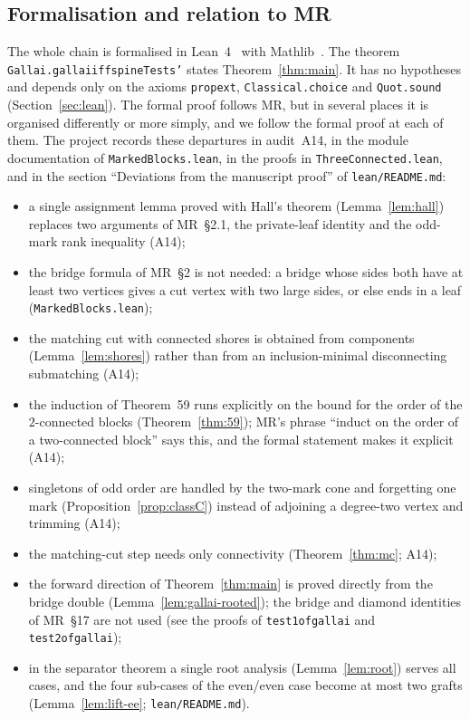 \documentclass[11pt]{amsart}
\theoremstyle{definition}
\theoremstyle{remark}
\renewcommand{\_}{\oldunderscore\allowbreak}
\begin{document}
\subsection*{Formalisation and relation to MR}
The whole chain is formalised in Lean~4~\cite{Lean4} with Mathlib~\cite{Mathlib}. The theorem
\texttt{Gallai.gallai\_iff\_spineTests'} states Theorem~\ref{thm:main}. It has no hypotheses and
depends only on the axioms \texttt{propext}, \texttt{Classical.choice} and \texttt{Quot.sound}
(Section~\ref{sec:lean}). The formal proof follows MR, but in several places it is organised
differently or more simply, and we follow the formal proof at each of them. The project records
these departures in audit~A14, in the module documentation of \texttt{MarkedBlocks.lean}, in the
proofs in \texttt{ThreeConnected.lean}, and in the section ``Deviations from the manuscript proof'' of
\texttt{lean/README.md}:
\begin{itemize}
\item a single assignment lemma proved with Hall's theorem (Lemma~\ref{lem:hall}) replaces two
arguments of MR~\S2.1, the private-leaf identity and the odd-mark rank inequality (A14);
\item the bridge formula of MR~\S2 is not needed: a bridge whose sides both have at least two
vertices gives a cut vertex with two large sides, or else ends in a leaf (\texttt{MarkedBlocks.lean});
\item the matching cut with connected shores is obtained from components
(Lemma~\ref{lem:shores}) rather than from an inclusion-minimal disconnecting submatching (A14);
\item the induction of Theorem~59 runs explicitly on the bound for the order of the
$2$-connected blocks (Theorem~\ref{thm:59}); MR's phrase ``induct on the order of a two-connected
block'' says this, and the formal statement makes it explicit (A14);
\item singletons of odd order are handled by the two-mark cone and forgetting one mark
(Proposition~\ref{prop:classC}) instead of adjoining a degree-two vertex and trimming (A14);
\item the matching-cut step needs only connectivity (Theorem~\ref{thm:mc}; A14);
\item the forward direction of Theorem~\ref{thm:main} is proved directly from the bridge double
(Lemma~\ref{lem:gallai-rooted}); the bridge and diamond identities of MR~\S17 are not used
(see the proofs of \texttt{test1\_of\_gallai} and \texttt{test2\_of\_gallai});
\item in the separator theorem a single root analysis (Lemma~\ref{lem:root}) serves all cases, and
the four sub-cases of the even/even case become at most two grafts (Lemma~\ref{lem:lift-ee};
\texttt{lean/README.md}).
\end{itemize}
\end{document}
